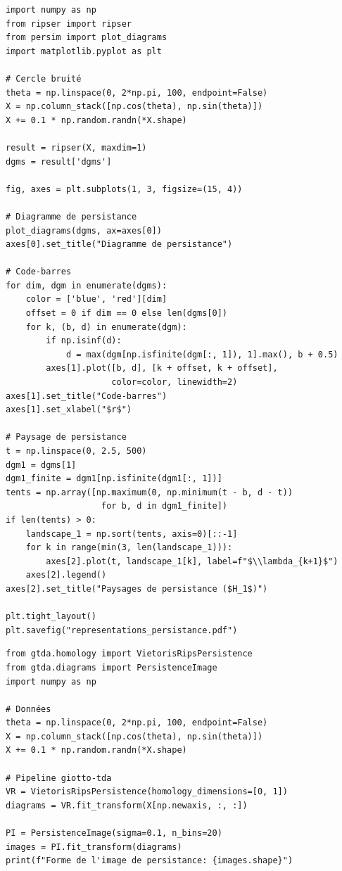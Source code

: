 \begin{codeblock}[title=\textbf{Visualisation des diagrammes et codes-barres}]
\begin{verbatim}
import numpy as np
from ripser import ripser
from persim import plot_diagrams
import matplotlib.pyplot as plt

# Cercle bruité
theta = np.linspace(0, 2*np.pi, 100, endpoint=False)
X = np.column_stack([np.cos(theta), np.sin(theta)])
X += 0.1 * np.random.randn(*X.shape)

result = ripser(X, maxdim=1)
dgms = result['dgms']

fig, axes = plt.subplots(1, 3, figsize=(15, 4))

# Diagramme de persistance
plot_diagrams(dgms, ax=axes[0])
axes[0].set_title("Diagramme de persistance")

# Code-barres
for dim, dgm in enumerate(dgms):
    color = ['blue', 'red'][dim]
    offset = 0 if dim == 0 else len(dgms[0])
    for k, (b, d) in enumerate(dgm):
        if np.isinf(d):
            d = max(dgm[np.isfinite(dgm[:, 1]), 1].max(), b + 0.5)
        axes[1].plot([b, d], [k + offset, k + offset],
                     color=color, linewidth=2)
axes[1].set_title("Code-barres")
axes[1].set_xlabel("$r$")

# Paysage de persistance
t = np.linspace(0, 2.5, 500)
dgm1 = dgms[1]
dgm1_finite = dgm1[np.isfinite(dgm1[:, 1])]
tents = np.array([np.maximum(0, np.minimum(t - b, d - t))
                   for b, d in dgm1_finite])
if len(tents) > 0:
    landscape_1 = np.sort(tents, axis=0)[::-1]
    for k in range(min(3, len(landscape_1))):
        axes[2].plot(t, landscape_1[k], label=f"$\\lambda_{k+1}$")
    axes[2].legend()
axes[2].set_title("Paysages de persistance ($H_1$)")

plt.tight_layout()
plt.savefig("representations_persistance.pdf")
\end{verbatim}
\end{codeblock}

\begin{codeblock}[title=\textbf{Images de persistance avec giotto-tda}]
\begin{verbatim}
from gtda.homology import VietorisRipsPersistence
from gtda.diagrams import PersistenceImage
import numpy as np

# Données
theta = np.linspace(0, 2*np.pi, 100, endpoint=False)
X = np.column_stack([np.cos(theta), np.sin(theta)])
X += 0.1 * np.random.randn(*X.shape)

# Pipeline giotto-tda
VR = VietorisRipsPersistence(homology_dimensions=[0, 1])
diagrams = VR.fit_transform(X[np.newaxis, :, :])

PI = PersistenceImage(sigma=0.1, n_bins=20)
images = PI.fit_transform(diagrams)
print(f"Forme de l'image de persistance: {images.shape}")
\end{verbatim}
\end{codeblock}

